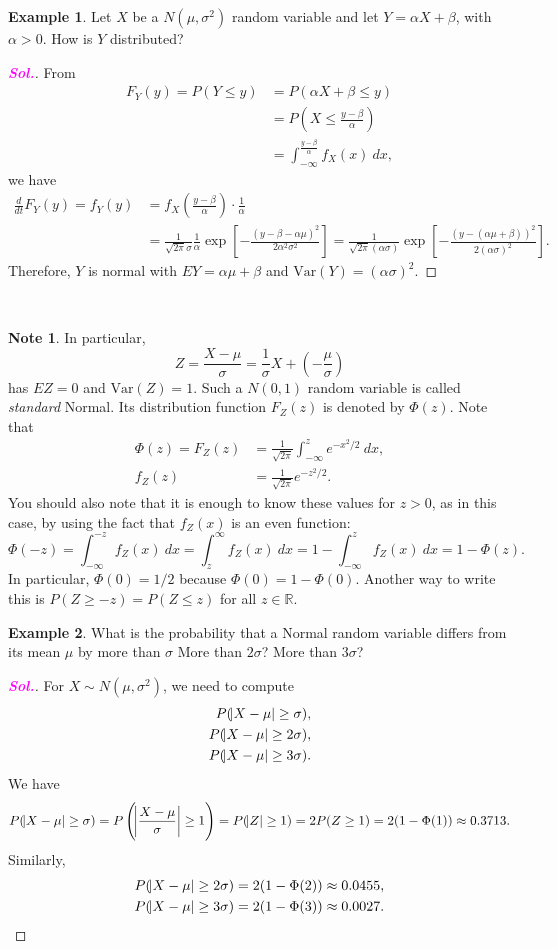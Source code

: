 \documentclass[12pt,a4paper]{article}
\theoremstyle{definition}
\newtheorem{example}{Example}[section]
\theoremstyle{definition}
\theoremstyle{definition}
\theoremstyle{definition}
\theoremstyle{remark}
\theoremstyle{definition}
\newtheorem*{note}{Note}
\newcommand{\dispsty}{\displaystyle}
\newcommand{\sol}{\textcolor{magenta}{\bf \textit{Sol.}}\quad}
\newcommand{\Var}{\text{Var}}
\begin{document}
\begin{example}
	Let $X$ be a $N(\mu,\sigma^2)$ random variable and let $Y=\alpha X+\beta$, with $\alpha>0$. How is $Y$ distributed?\begin{proof}[\sol]
		From \begin{align*}
		F_Y(y)=P(Y\leq y) &=P(\alpha X+\beta\leq y)\\
		&=P\left(X\leq\frac{y-\beta}{\alpha}\right)\\
		&=\int_{-\infty}^{\dispsty\frac{y-\beta}{\alpha}}f_X(x)\ dx,
		\end{align*} we have \begin{align*}
		\frac{d}{dt}F_Y(y)=f_Y(y)&=f_X\left(\frac{y-\beta}{\alpha}\right)\cdot\frac{1}{\alpha}\\
		&=\frac{1}{\sqrt{2\pi}\sigma}\frac{1}{\alpha}\exp\left[-\frac{(y-\beta-\alpha\mu)^2}{2\alpha^2\sigma^2}\right]=\frac{1}{\sqrt{2\pi}(\alpha\sigma)}\exp\left[-\frac{(y-(\alpha\mu+\beta))^2}{2(\alpha\sigma)^2}\right].
		\end{align*} Therefore, $Y$ is normal with $EY=\alpha\mu+\beta$ and $\Var(Y)=(\alpha\sigma)^2$.
	\end{proof}
\end{example}
\
\begin{note}
	In particular, \[
	Z=\frac{X-\mu}{\sigma}=\frac{1}{\sigma}X+\left(-\frac{\mu}{\sigma}\right)
	\] has $EZ=0$ and $\Var(Z)=1$. Such a $N(0,1)$ random variable is called \textit{standard} Normal. Its distribution function $F_Z(z)$ is denoted by $\Phi(z)$. Note that \begin{align*}
	\Phi(z)=F_Z(z)&=\frac{1}{\sqrt{2\pi}}\int_{-\infty}^ze^{-x^2/2}\ dx,\\
	f_Z(z)&=\frac{1}{\sqrt{2\pi}}e^{-z^2/2}.
	\end{align*} You should also note that it is enough to know these values for $z>0$, as in this case, by using the fact that $f_Z(x)$ is an even function: \[
	\Phi(-z)=\int_{-\infty}^{-z}f_Z(x)\ dx=\int_{z}^{\infty}f_Z(x)\ dx =1-\int_{-\infty}^zf_Z(x)\ dx=1-\Phi(z).
	\] In particular, $\Phi(0)=1/2$ because $\Phi(0)=1-\Phi(0)$. Another way to write this is $P(Z\geq -z)=P(Z\leq z)$ for all $z\in\mathbb{R}$.
\end{note}
\begin{example}
	What is the probability that a Normal random variable differs from its mean $\mu$ by more than $\sigma$ More than $2\sigma$? More than $3\sigma$?\begin{proof}[\sol]
		For $X\sim N(\mu,\sigma^2)$, we need to compute \begin{align*}
		P(\abs{X-\mu}\geq\sigma),\\
		P(\abs{X-\mu}\geq2\sigma),\\
		P(\abs{X-\mu}\geq3\sigma).
		\end{align*} We have \[
		P(\abs{X-\mu}\geq\sigma)=P\left(\abs{\frac{X-\mu}{\sigma}}\geq1\right)=P(\abs{Z}\geq 1)=2P(Z\geq 1)=2(1-\Phi(1))\approx0.3713.
		\] Similarly, \begin{align*}
		P(\abs{X-\mu}\geq2\sigma)=2(1-\Phi(2))\approx0.0455,\\
		P(\abs{X-\mu}\geq3\sigma)=2(1-\Phi(3))\approx0.0027.
		\end{align*}
	\end{proof}
\end{example}
\end{document}
